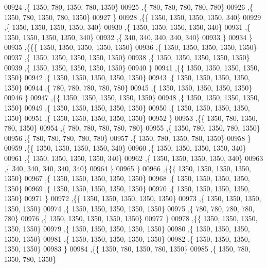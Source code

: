 \begin{DoxyCode}
00924    ,\{  1350,   780,  1350,   780,  1350\}
00925    ,\{   780,   780,   780,   780,   780\}
00926    ,\{  1350,   780,  1350,   780,  1350\}
00927    \}
00928   ,\{\{  1350,  1350,  1350,  1350,   340\}
00929    ,\{  1350,  1350,  1350,  1350,   340\}
00930    ,\{  1350,  1350,  1350,  1350,   340\}
00931    ,\{  1350,  1350,  1350,  1350,   340\}
00932    ,\{   340,   340,   340,   340,   340\}
00933    \}
00934   \}
00935  ,\{\{\{  1350,  1350,  1350,  1350,  1350\}
00936    ,\{  1350,  1350,  1350,  1350,  1350\}
00937    ,\{  1350,  1350,  1350,  1350,  1350\}
00938    ,\{  1350,  1350,  1350,  1350,  1350\}
00939    ,\{  1350,  1350,  1350,  1350,  1350\}
00940    \}
00941   ,\{\{  1350,  1350,  1350,  1350,  1350\}
00942    ,\{  1350,  1350,  1350,  1350,  1350\}
00943    ,\{  1350,  1350,  1350,  1350,  1350\}
00944    ,\{   780,   780,   780,   780,   780\}
00945    ,\{  1350,  1350,  1350,  1350,  1350\}
00946    \}
00947   ,\{\{  1350,  1350,  1350,  1350,  1350\}
00948    ,\{  1350,  1350,  1350,  1350,  1350\}
00949    ,\{  1350,  1350,  1350,  1350,  1350\}
00950    ,\{  1350,  1350,  1350,  1350,  1350\}
00951    ,\{  1350,  1350,  1350,  1350,  1350\}
00952    \}
00953   ,\{\{  1350,   780,  1350,   780,  1350\}
00954    ,\{   780,   780,   780,   780,   780\}
00955    ,\{  1350,   780,  1350,   780,  1350\}
00956    ,\{   780,   780,   780,   780,   780\}
00957    ,\{  1350,   780,  1350,   780,  1350\}
00958    \}
00959   ,\{\{  1350,  1350,  1350,  1350,   340\}
00960    ,\{  1350,  1350,  1350,  1350,   340\}
00961    ,\{  1350,  1350,  1350,  1350,   340\}
00962    ,\{  1350,  1350,  1350,  1350,   340\}
00963    ,\{   340,   340,   340,   340,   340\}
00964    \}
00965   \}
00966  ,\{\{\{  1350,  1350,  1350,  1350,  1350\}
00967    ,\{  1350,  1350,  1350,  1350,  1350\}
00968    ,\{  1350,  1350,  1350,  1350,  1350\}
00969    ,\{  1350,  1350,  1350,  1350,  1350\}
00970    ,\{  1350,  1350,  1350,  1350,  1350\}
00971    \}
00972   ,\{\{  1350,  1350,  1350,  1350,  1350\}
00973    ,\{  1350,  1350,  1350,  1350,  1350\}
00974    ,\{  1350,  1350,  1350,  1350,  1350\}
00975    ,\{   780,   780,   780,   780,   780\}
00976    ,\{  1350,  1350,  1350,  1350,  1350\}
00977    \}
00978   ,\{\{  1350,  1350,  1350,  1350,  1350\}
00979    ,\{  1350,  1350,  1350,  1350,  1350\}
00980    ,\{  1350,  1350,  1350,  1350,  1350\}
00981    ,\{  1350,  1350,  1350,  1350,  1350\}
00982    ,\{  1350,  1350,  1350,  1350,  1350\}
00983    \}
00984   ,\{\{  1350,   780,  1350,   780,  1350\}
00985    ,\{  1350,   780,  1350,   780,  1350\}

\end{DoxyCode}
